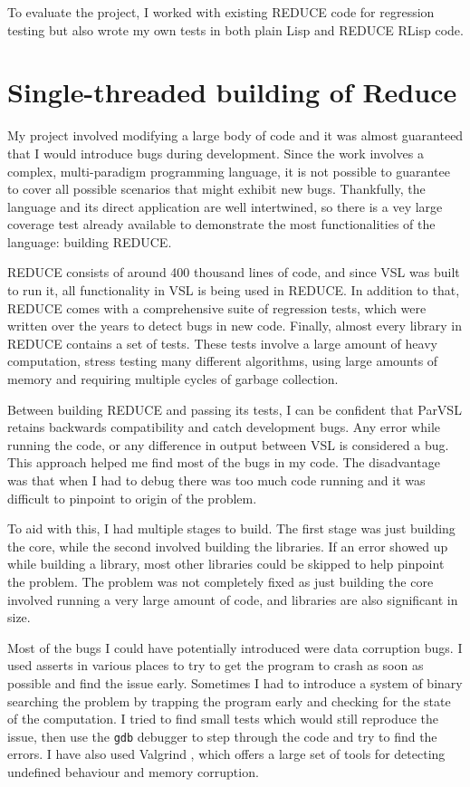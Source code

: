 To evaluate the project, I worked with existing REDUCE code for regression testing
but also wrote my own tests in both plain Lisp and REDUCE RLisp code.

\section{Single-threaded building of Reduce}

My project involved modifying a large body of code and it was almost guaranteed
that I would introduce bugs during development. Since the work involves a complex,
multi-paradigm programming language, it is not possible to guarantee to cover all
possible scenarios that might exhibit new bugs. Thankfully, the language and its
direct application are well intertwined, so there is a vey large coverage test already
available to demonstrate the most functionalities of the language: building REDUCE.

REDUCE consists of around 400 thousand lines of code, and since VSL was built to
run it, all functionality in VSL is being used in REDUCE. In addition to that,
REDUCE comes with a comprehensive suite of regression tests, which were written over the
years to detect bugs in new code. Finally, almost every library in REDUCE contains a
set of tests. These tests involve a large amount of heavy computation, stress testing
many different algorithms, using large amounts of memory and requiring multiple cycles
of garbage collection.

Between building REDUCE and passing its tests, I can be confident that ParVSL retains
backwards compatibility and catch development bugs. Any error while running the code,
or any difference in output between VSL is considered a bug. This approach helped me
find most of the bugs in my code. The disadvantage was that when I had to debug there
was too much code running and it was difficult to pinpoint to origin of the problem.

To aid with this, I had multiple stages to build. The first stage was just building
the core, while the second involved building the libraries. If an error showed up while
building a library, most other libraries could be skipped to help pinpoint the problem.
The problem was not completely fixed as just building the core involved running
a very large amount of code, and libraries are also significant in size.

Most of the bugs I could have potentially introduced were data corruption bugs.
I used asserts in various places to try to get the program to crash as soon as possible
and find the issue early. Sometimes I had to introduce a system of binary searching the
problem by trapping the program early and checking for the state of the computation.
I tried to find small tests which would still reproduce the issue, then use the
\texttt{gdb} \cite{gdb} debugger to step through the code and try to find the errors. I have also used
Valgrind \cite{valgrind}, which offers a large set of tools for detecting undefined behaviour and memory
corruption.

